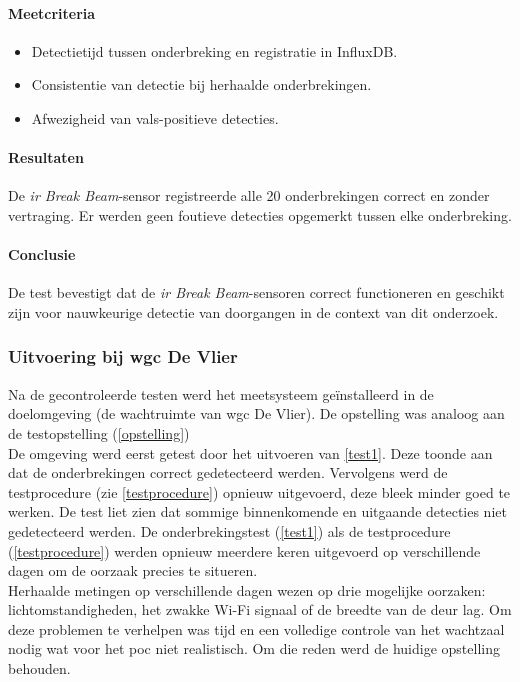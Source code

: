 \paragraph{Meetcriteria}
\begin{itemize}
    \item Detectietijd tussen onderbreking en registratie in InfluxDB.
    \item Consistentie van detectie bij herhaalde onderbrekingen.
    \item Afwezigheid van vals-positieve detecties.
\end{itemize}

\paragraph{Resultaten}
De \textit{\gls{ir} Break Beam}-sensor registreerde alle 20 onderbrekingen correct en zonder vertraging. Er werden geen foutieve detecties opgemerkt tussen elke onderbreking.

\paragraph{Conclusie}
De test bevestigt dat de \textit{\gls{ir} Break Beam}-sensoren correct functioneren en geschikt zijn voor nauwkeurige detectie van doorgangen in de context van dit onderzoek.

\subsubsection{Uitvoering bij \gls{wgc} De Vlier}
Na de gecontroleerde testen werd het meetsysteem geïnstalleerd in de doelomgeving (de wachtruimte van \gls{wgc} De Vlier). De opstelling was analoog aan de testopstelling (\ref{opstelling}) \\

De omgeving werd eerst getest door het uitvoeren van \ref{test1}. Deze toonde aan dat de onderbrekingen correct gedetecteerd werden. Vervolgens werd de testprocedure (zie \ref{testprocedure}) opnieuw uitgevoerd, deze bleek minder goed te werken. De test liet zien dat sommige binnenkomende en uitgaande detecties niet gedetecteerd werden. De onderbrekingstest (\ref{test1}) als de testprocedure (\ref{testprocedure}) werden opnieuw meerdere keren uitgevoerd op verschillende dagen om de oorzaak precies te situeren. \\

Herhaalde metingen op verschillende dagen wezen op drie mogelijke oorzaken: lichtomstandigheden, het zwakke Wi-Fi signaal of de breedte van de deur lag. Om deze problemen te verhelpen was tijd en een volledige controle van het wachtzaal nodig wat voor het \gls{poc} niet realistisch. Om die reden werd de huidige opstelling behouden.       

